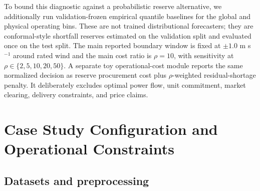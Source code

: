 \documentclass[
  11pt]{article}
\begin{document}
To bound this diagnostic against a probabilistic reserve alternative, we
additionally run validation-frozen empirical quantile baselines for the
global and physical operating bins. These are not trained distributional
forecasters; they are conformal-style shortfall reserves estimated on
the validation split and evaluated once on the test split. The main
reported boundary window is fixed at \(\pm 1.0\) m s\(^{-1}\) around
rated wind and the main cost ratio is \(\rho=10\), with sensitivity at
\(\rho \in \{2,5,10,20,50\}\). A separate toy operational-cost module
reports the same normalized decision as reserve procurement cost plus
\(\rho\)-weighted residual-shortage penalty. It deliberately excludes
optimal power flow, unit commitment, market clearing, delivery
constraints, and price claims.

\begingroup
\footnotesize
\setlength{\fboxsep}{5pt}
\noindent{}
\par
\endgroup

\section{Case Study Configuration and Operational
Constraints}\label{case-study-configuration-and-operational-constraints}

\subsection{Datasets and
preprocessing}\label{datasets-and-preprocessing}
\end{document}
